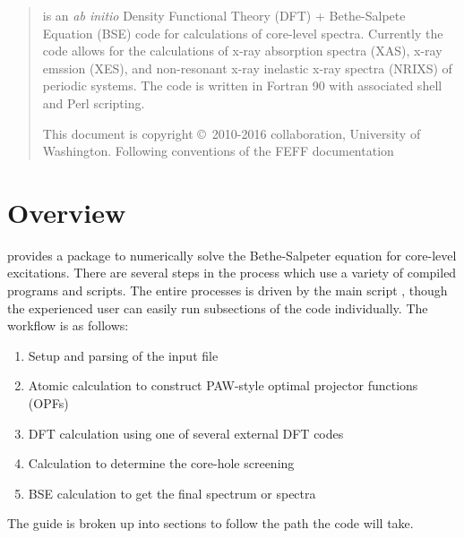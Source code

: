 \documentclass[11pt]{report}
\begin{document}
\MakeTitle

\newchapter{}
\begin{abstract}
 is an {\it ab initio} Density Functional Theory (DFT) + Bethe-Salpete Equation (BSE) code for calculations of core-level 
spectra. Currently the code allows for the calculations of x-ray absorption spectra (XAS), x-ray emssion (XES), and non-resonant x-ray 
inelastic x-ray spectra (NRIXS) of periodic systems. The code is written in Fortran 90 with associated shell and Perl scripting.




 \noindent This document is copyright \copyright\ 2010-2016  collaboration, University of Washington. Following conventions of the FEFF documentation

\end{abstract}

\newchapter{}
\tableofcontents
\newchapter{}

\setcounter{page}{1}


\chapter{Overview}



 provides a package to numerically solve the Bethe-Salpeter equation for core-level excitations. 
There are several steps in the process which use a variety of compiled programs and scripts. 
The entire processes is driven by the main script , though the experienced user 
can easily run subsections of the code individually.
The  workflow is as follows:

\begin{enumerate}
\item Setup and parsing of the input file
\item Atomic calculation to construct PAW-style optimal projector functions (OPFs)
\item DFT calculation using one of several external DFT codes
\item Calculation to determine the core-hole screening
\item BSE calculation to get the final spectrum or spectra
\end{enumerate}

The guide is broken up into sections to follow the path the code will take. 
\end{document}
